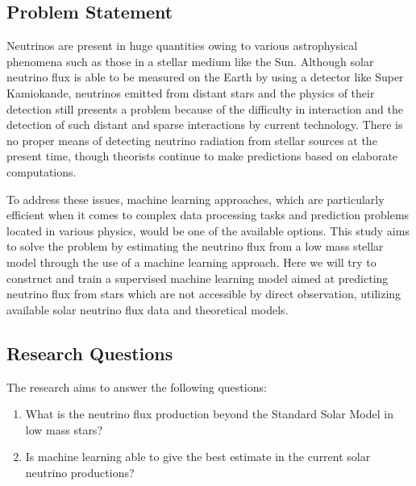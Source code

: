 \subsection{Problem Statement}
Neutrinos are present in huge quantities owing to various astrophysical phenomena such as those in a stellar medium like the Sun. Although solar neutrino flux is able to be measured on the Earth by using a detector like Super Kamiokande, neutrinos emitted from distant stars and the physics of their detection still presents a problem because of the difficulty in interaction and the detection of such distant and sparse interactions by current technology. There is no proper means of detecting neutrino radiation from stellar sources at the present time, though theorists continue to make predictions based on elaborate computations.
 
To address these issues, machine learning approaches, which are particularly efficient when it comes to complex data processing tasks and prediction problems located in various physics, would be one of the available options. This study aims to solve the problem by estimating the neutrino flux from a low mass stellar model through the use of a machine learning approach. Here we will try to construct and train a supervised machine learning model aimed at predicting neutrino flux from stars which are not accessible by direct observation, utilizing available solar neutrino flux data and theoretical models.


\subsection{Research Questions}

The research aims to answer the following questions:
\begin{enumerate}
	\item What is the neutrino flux production beyond the Standard Solar Model in low mass stars?
	\item Is machine learning able to give the best estimate in the current solar neutrino productions? 
	
\end{enumerate}
